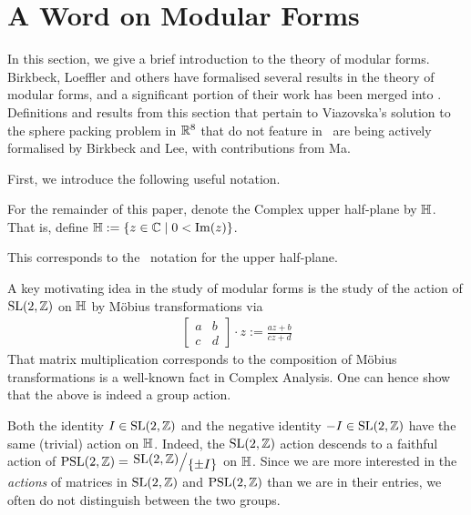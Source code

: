 \section{A Word on Modular Forms}
\label{Ch2:Sec:ModForms}

\begin{comment}
Things to discuss:
1. What is a modular form
2. What is a quasimodular form
3. Examples: Eisenstein Series, Jacobi Theta functions, Discriminant form
We can reference things like the q-expansions of the Eisenstein series, the transformation rules for the Jacobi theta functions, and the product formula for the discriminant form.
\end{comment}

In this section, we give a brief introduction to the theory of modular forms. Birkbeck, Loeffler and others have formalised several results in the theory of modular forms, and a significant portion of their work has been merged into \mathlib. Definitions and results from this section that pertain to Viazovska's solution to the sphere packing problem in $\mathbb{R}^8$ that do not feature in \mathlib\ are being actively formalised by Birkbeck and Lee, with contributions from Ma.

First, we introduce the following useful notation.

\begin{boxnotation}
    For the remainder of this paper, denote the Complex upper half-plane by $\mathbb{H}$. That is, define $\mathbb{H} := \left\{ z \in \mathbb{C} \; \middle\vert \; 0 < \operatorname{Im}(z) \right\}$.
\end{boxnotation}

This corresponds to the \mathlib\ notation for the upper half-plane.

A key motivating idea in the study of modular forms is the study of the action of $\operatorname{SL}\!\left( 2, \mathbb{Z} \right)$ on $\mathbb{H}$ by Möbius transformations via
\begin{align*}
    \begin{bmatrix}
        a & b \\ c & d
    \end{bmatrix}
    \cdot z := \frac{az + b}{cz + d}
\end{align*}
That matrix multiplication corresponds to the composition of Möbius transformations is a well-known fact in Complex Analysis. One can hence show that the above is indeed a group action.

Both the identity $I \in \operatorname{SL}\!\left( 2, \mathbb{Z} \right)$ and the negative identity $-I \in \operatorname{SL}\!\left( 2, \mathbb{Z} \right)$ have the same (trivial) action on $\mathbb{H}$. Indeed, the $\operatorname{SL}\!\left( 2, \mathbb{Z} \right)$ action descends to a faithful action of $\PSL{2, \Z} = \quotient{\SL{2, \Z}}{\set{\pm I}}$ on $\mathbb{H}$. Since we are more interested in the \textit{actions} of matrices in $\operatorname{SL}\!\left( 2, \mathbb{Z} \right)$ and $\operatorname{PSL}\!\left( 2, \mathbb{Z} \right)$ than we are in their entries, we often do not distinguish between the two groups.

